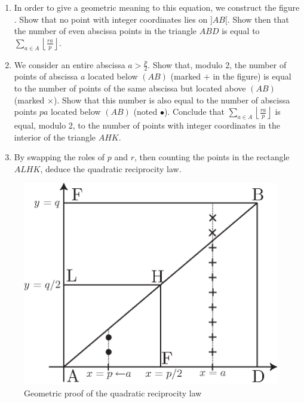 \begin{exo}
\begin{enumerate}
\item In order to give a geometric meaning to this equation, we construct the figure . Show that no point with integer coordinates lies on $] AB [$. Show then that the number of even abscissa points in the triangle $ ABD $ is equal to $ \sum_{a \in A}{\left\lfloor \frac{ra}{p} \right\rfloor} $.
\item We consider an entire abscissa $ a> \frac{p}{2} $. Show that, modulo 2, the number of points of abscissa $ a $ located below $ (AB) $ (marked $ + $ in the figure) is equal to the number of points of the same abscissa but located above $ (AB) $ (marked $ \times $). Show that this number is also equal to the number of abscissa points $ pa $ located below $ (AB) $ (noted $ \bullet $). Conclude that $ \sum_{a \in A}{\left\lfloor \frac{ra}{p} \right\rfloor} $ is equal, modulo 2, to the number of points with integer coordinates in the interior of the triangle $ AHK $.
\item By swapping the roles of $ p $ and $ r $, then counting the points in the rectangle $ ALHK $, deduce the quadratic reciprocity law.
\end{enumerate} \begin{figure}[ht] 
    \begin{center}
    \includegraphics [scale = 0.7]{images/demo-geom-reciprocite.eps}
    \end{center}
    \caption{Geometric proof of the quadratic reciprocity law}
              \label{fig-demo-geom-reciprocite}
\end{figure}
\end{exo}
 
